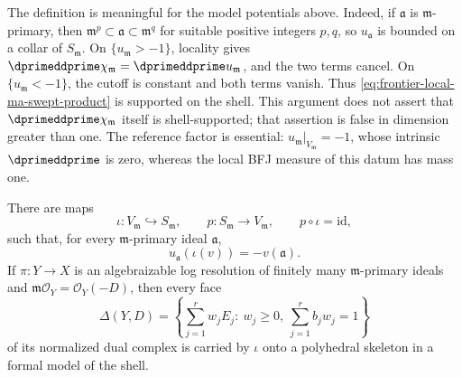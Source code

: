 The definition is meaningful for the model potentials above.  Indeed, if
\(\mathfrak a\) is \(\mathfrak m\)-primary, then
\(\mathfrak m^p\subset\mathfrak a\subset\mathfrak m^q\) for suitable
positive integers \(p,q\), so \(u_{\mathfrak a}\) is bounded on a collar of
\(S_{\mathfrak m}\).  On \(\{u_{\mathfrak m}>-1\}\), locality gives
\(\dprimeddprime\chi_{\mathfrak m}
=\dprimeddprime u_{\mathfrak m}\), and the two terms cancel.  On
\(\{u_{\mathfrak m}<-1\}\), the cutoff is constant and both terms vanish.
Thus \eqref{eq:frontier-local-ma-swept-product} is supported on the shell.
This argument does not assert that
\(\dprimeddprime\chi_{\mathfrak m}\) itself is shell-supported; that
assertion is false in dimension greater than one.  The reference factor is
essential: \(u_{\mathfrak m}|_{V_{\mathfrak m}}=-1\), whose intrinsic
\(\dprimeddprime\) is zero, whereas the local BFJ measure of this datum has
mass one.

\begin{lemma}\label{lem:frontier-local-ma-gauss}
There are maps
\[
 \iota:V_{\mathfrak m}\hookrightarrow S_{\mathfrak m},
 \qquad
 p:S_{\mathfrak m}\longrightarrow V_{\mathfrak m},
 \qquad p\circ\iota=\mathrm{id},
\]
such that, for every \(\mathfrak m\)-primary ideal \(\mathfrak a\),
\begin{equation}
             u_{\mathfrak a}(\iota(v))=-v(\mathfrak a).
 \label{eq:frontier-local-ma-gauss-ideal}
\end{equation}
If \(\pi:Y\to X\) is an algebraizable log resolution of finitely many
\(\mathfrak m\)-primary ideals and
\(\mathfrak m\mathcal O_Y=\mathcal O_Y(-D)\), then every face
\begin{equation}
 \Delta(Y,D)=
 \left\{\sum_{j=1}^r w_jE_j:\ w_j\geq0,
                       \ \sum_{j=1}^r b_jw_j=1\right\}
 \label{eq:frontier-local-ma-dual-face}
\end{equation}
of its normalized dual complex is carried by \(\iota\) onto a polyhedral
skeleton in a formal model of the shell.
\end{lemma}

